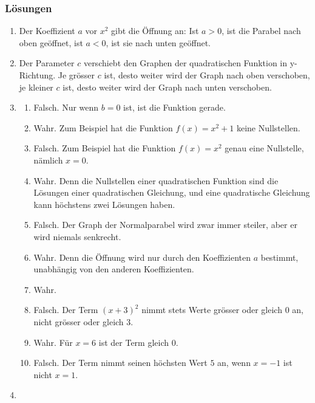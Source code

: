 \subsubsection*{Lösungen}
\begin{enumerate}
    \item Der Koeffizient $a$ vor $x^2$ gibt die Öffnung an: Ist $a>0$, ist die Parabel nach oben geöffnet, ist $a<0$, ist sie nach unten geöffnet.
    \item Der Parameter $c$ verschiebt den Graphen der quadratischen Funktion in y-Richtung. Je grösser $c$ ist, desto weiter wird der Graph nach oben verschoben, je kleiner $c$ ist, desto weiter wird der Graph nach unten verschoben.
    \item
          \begin{enumerate}
              \item Falsch. Nur wenn $b=0$ ist, ist die Funktion gerade.
              \item Wahr. Zum Beispiel hat die Funktion $f(x)=x^2+1$ keine Nullstellen.
              \item Falsch. Zum Beispiel hat die Funktion $f(x)=x^2$ genau eine Nullstelle, nämlich $x=0$.
              \item Wahr. Denn die Nullstellen einer quadratischen Funktion sind die Lösungen einer quadratischen Gleichung, und eine quadratische Gleichung kann höchstens zwei Lösungen haben.
              \item Falsch. Der Graph der Normalparabel wird zwar immer steiler, aber er wird niemals senkrecht.
              \item Wahr. Denn die Öffnung wird nur durch den Koeffizienten $a$ bestimmt, unabhängig von den anderen Koeffizienten.
              \item Wahr.
              \item Falsch. Der Term $(x+3)^2$ nimmt stets Werte grösser oder gleich $0$ an, nicht grösser oder gleich $3$.
              \item Wahr. Für $x=6$ ist der Term gleich $0$.
              \item Falsch. Der Term nimmt seinen höchsten Wert $5$ an, wenn $x=-1$ ist nicht $x=1$.
          \end{enumerate}
    \item \begin{minipage}[t]{0.8\textwidth}
              \vspace{0pt}


\end{minipage}
\end{enumerate}
